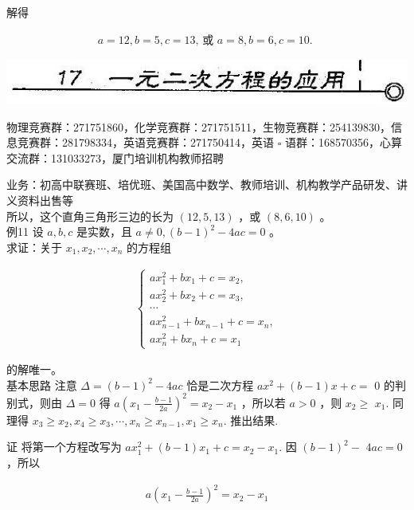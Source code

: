 \documentclass[10pt]{article}
\begin{document}
解得

\begin{align*}
a=12, b=5, c=13 \text {, 或 } a=8, b=6, c=10 \text {. }
\end{align*}

\begin{center}
\includegraphics[max width=\textwidth]{2024_10_30_26b590fd1106d28139f0g-117}
\end{center}

物理竞赛群：271751860，化学竞赛群：271751511，生物竞赛群：254139830，信息竞赛群：281798334，英语竞赛群：271750414，英语 $\square$ 语群：168570356，心算交流群：131033273，厦门培训机构教师招聘

业务：初高中联赛班、培优班、美国高中数学、教师培训、机构教学产品研发、讲义资料出售等\\
所以，这个直角三角形三边的长为 $(12,5,13)$ ，或 $(8,6,10)$ 。\\
例11 设 $a, b, c$ 是实数，且 $a \neq 0,(b-1)^{2}-4 a c=0$ 。\\
求证：关于 $x_{1}, x_{2}, \cdots, x_{n}$ 的方程组

\begin{align*}
\left\{\begin{array}{l}
a x_{1}^{2}+b x_{1}+c=x_{2}, \\
a x_{2}^{2}+b x_{2}+c=x_{3}, \\
\cdots \\
a x_{n-1}^{2}+b x_{n-1}+c=x_{n}, \\
a x_{n}^{2}+b x_{n}+c=x_{1}
\end{array}\right.
\end{align*}

的解唯一。\\
基本思路 注意 $\Delta=(b-1)^{2}-4 a c$ 恰是二次方程 $a x^{2}+(b-1) x+c=$ 0 的判别式，则由 $\Delta=0$ 得 $a\left(x_{1}-\frac{b-1}{2 a}\right)^{2}=x_{2}-x_{1}$ ，所以若 $a>0$ ，则 $x_{2} \geqslant$ $x_{1}$. 同理得 $x_{3} \geqslant x_{2}, x_{4} \geqslant x_{3}, \cdots, x_{n} \geqslant x_{n-1}, x_{1} \geqslant x_{n}$. 推出结果.

证 将第一个方程改写为 $a x_{1}^{2}+(b-1) x_{1}+c=x_{2}-x_{1}$. 因 $(b-1)^{2}-$ $4 a c=0$ ，所以

\begin{align*}
a\left(x_{1}-\frac{b-1}{2 a}\right)^{2}=x_{2}-x_{1} \tag{1}
\end{align*}
\end{document}
